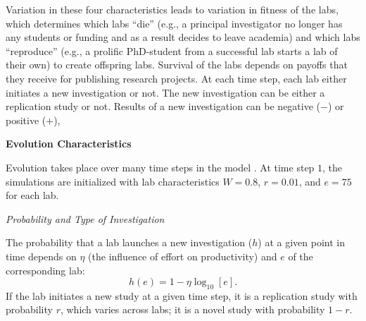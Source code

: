 \documentclass[meta, authordate]{jote-new-article}
\begin{document}
Variation in these four characteristics leads to variation in fitness of the labs, which determines which labs ``die'' (e.g., a principal investigator no longer has any students or funding and as a result decides to leave academia) and which labs ``reproduce'' (e.g., a prolific PhD-student from a successful lab starts a lab of their own) to create offspring labs. Survival of the labs depends on payoffs that they receive for publishing research projects. At each time step, each lab either initiates a new investigation or not. The new investigation can be either a replication study or not. Results of a new investigation can be negative ($-$) or positive ($+$),\newpage

\begin{adjustwidth}{-4cm}{}
  \begin{tcolorbox}[
      enhanced,
      frame hidden,
      sharp corners,
      titlerule=0pt,
      colframe=joteOrangeLight,
      colbacktitle=joteOrangeLight,
      colback=joteOrangeLight,
      coltitle=jotedark,
      fontupper={\openreg \color{jotedark}},
      fonttitle={\overpass \bfseries \LARGE \color{jotedark}},
      top=\dimexpr\smallwidth,
      bottom=\dimexpr\smallwidth,
      title={\vskip-.7em%
          Box 1: Evolution in \textcite{SmaldinoMcelreath2016}%
          \vspace*{.2em}},
      before upper={\parindent10pt},
    ]

    \scriptsize{

      \noindent\textbf{Evolution Characteristics}
      \vspace*{\baselineskip}

      \noindent Evolution takes place over many time steps in the model \parencite[i.e., $100,000$ in Figure~$3$ and $1,000,000$ in Figures~$4$ and $5$ of][]{SmaldinoMcelreath2016}. At time step $1$, the simulations are initialized with lab characteristics $W=0.8$, $r=0.01$, and $e=75$ for each lab.

      \vspace*{\baselineskip}
      \noindent \emph{Probability and Type of Investigation}
      \vspace*{\baselineskip}

      \noindent The probability that a lab launches a new investigation ($h$) at a given point in time depends on $\eta$ (the influence of effort on productivity) and $e$ of the corresponding lab:
      \begin{equation}
        h\left(e\right)=1-\eta\log_{10}\left[e\right]\text{.}
      \end{equation}
      If the lab initiates a new study at a given time step, it is a replication study with probability $r$, which varies across labs; it is a novel study with probability $1-r$.

}
\end{tcolorbox}
\end{adjustwidth}
\end{document}
